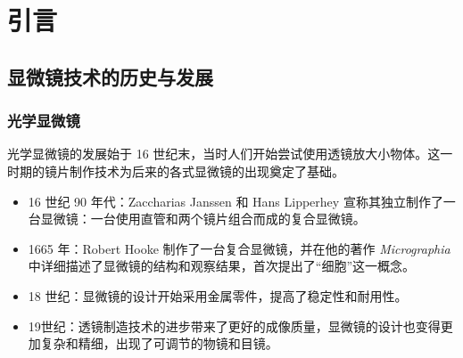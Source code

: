 \documentclass{article}
\begin{document}
\tableofcontents

\clearpage
{%
	\let\oldnumberline\numberline%
	\renewcommand{\numberline}{\figurename~\oldnumberline}%
	\listoffigures%
}

{%
	\let\oldnumberline\numberline%
	\renewcommand{\numberline}{\tablename~\oldnumberline}%
	\listoftables
}




\renewcommand{\headrulewidth}{0.4pt} %

\clearpage
{} %
\setcounter{page}{1}
\section{引言}
\subsection{显微镜技术的历史与发展}
\subsubsection[光学显微镜]{光学显微镜}
光学显微镜的发展始于 16 世纪末，当时人们开始尝试使用透镜放大小物体。这一时期的镜片制作技术为后来的各式显微镜的出现奠定了基础。
\begin{itemize}
	\item 16 世纪 90 年代：Zaccharias Janssen 和 Hans Lipperhey 宣称其独立制作了一台显微镜：一台使用直管和两个镜片组合而成的复合显微镜。
	\item 1665 年：Robert Hooke 制作了一台复合显微镜，并在他的著作 {\it Micrographia}中详细描述了显微镜的结构和观察结果，首次提出了“细胞”这一概念。
	\item 18 世纪：显微镜的设计开始采用金属零件，提高了稳定性和耐用性。
	\item 19世纪：透镜制造技术的进步带来了更好的成像质量，显微镜的设计也变得更加复杂和精细，出现了可调节的物镜和目镜。
\end{itemize}
\end{document}
